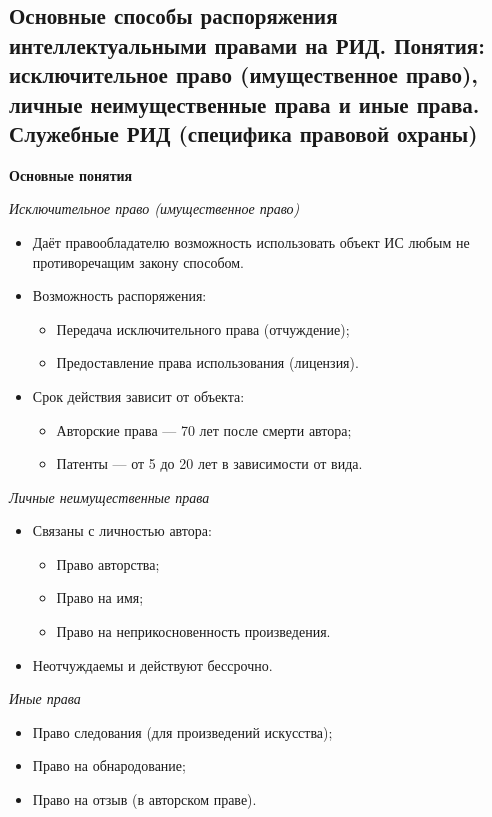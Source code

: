 \pagebreak
\subsection{Основные способы распоряжения интеллектуальными правами на РИД. Понятия: исключительное право (имущественное право), личные неимущественные права и иные права. Служебные РИД (специфика правовой охраны)}

\textbf{Основные понятия}

\textit{Исключительное право (имущественное право)}
\begin{itemize}
    \item Даёт правообладателю возможность использовать объект ИС любым не противоречащим закону способом.
    \item Возможность распоряжения:
    \begin{itemize}
        \item Передача исключительного права (отчуждение);
        \item Предоставление права использования (лицензия).
    \end{itemize}
    \item Срок действия зависит от объекта:
    \begin{itemize}
        \item Авторские права --- 70 лет после смерти автора;
        \item Патенты --- от 5 до 20 лет в зависимости от вида.
    \end{itemize}
\end{itemize}

\textit{Личные неимущественные права}
\begin{itemize}
    \item Связаны с личностью автора:
    \begin{itemize}
        \item Право авторства;
        \item Право на имя;
        \item Право на неприкосновенность произведения.
    \end{itemize}
    \item Неотчуждаемы и действуют бессрочно.
\end{itemize}

\textit{Иные права}
\begin{itemize}
    \item Право следования (для произведений искусства);
    \item Право на обнародование;
    \item Право на отзыв (в авторском праве).
\end{itemize}

